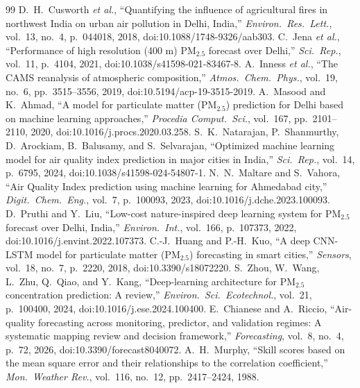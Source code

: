 \documentclass[conference]{IEEEtran}
\begin{document}
\begin{thebibliography}{99}
 D.~H.~Cusworth \emph{et al.}, ``Quantifying the influence of agricultural fires in northwest India on urban air pollution in Delhi, India,'' \emph{Environ.\ Res.\ Lett.}, vol.~13, no.~4, p.~044018, 2018, doi:10.1088/1748-9326/aab303.
 C.~Jena \emph{et al.}, ``Performance of high resolution (400 m) PM$_{2.5}$ forecast over Delhi,'' \emph{Sci.\ Rep.}, vol.~11, p.~4104, 2021, doi:10.1038/s41598-021-83467-8.
 A.~Inness \emph{et al.}, ``The CAMS reanalysis of atmospheric composition,'' \emph{Atmos.\ Chem.\ Phys.}, vol.~19, no.~6, pp.~3515--3556, 2019, doi:10.5194/acp-19-3515-2019.
 A.~Masood and K.~Ahmad, ``A model for particulate matter (PM$_{2.5}$) prediction for Delhi based on machine learning approaches,'' \emph{Procedia Comput.\ Sci.}, vol.~167, pp.~2101--2110, 2020, doi:10.1016/j.procs.2020.03.258.
 S.~K.~Natarajan, P.~Shanmurthy, D.~Arockiam, B.~Balusamy, and S.~Selvarajan, ``Optimized machine learning model for air quality index prediction in major cities in India,'' \emph{Sci.\ Rep.}, vol.~14, p.~6795, 2024, doi:10.1038/s41598-024-54807-1.
 N.~N.~Maltare and S.~Vahora, ``Air Quality Index prediction using machine learning for Ahmedabad city,'' \emph{Digit.\ Chem.\ Eng.}, vol.~7, p.~100093, 2023, doi:10.1016/j.dche.2023.100093.
 D.~Pruthi and Y.~Liu, ``Low-cost nature-inspired deep learning system for PM$_{2.5}$ forecast over Delhi, India,'' \emph{Environ.\ Int.}, vol.~166, p.~107373, 2022, doi:10.1016/j.envint.2022.107373.
 C.-J.~Huang and P.-H.~Kuo, ``A deep CNN-LSTM model for particulate matter (PM$_{2.5}$) forecasting in smart cities,'' \emph{Sensors}, vol.~18, no.~7, p.~2220, 2018, doi:10.3390/s18072220.
 S.~Zhou, W.~Wang, L.~Zhu, Q.~Qiao, and Y.~Kang, ``Deep-learning architecture for PM$_{2.5}$ concentration prediction: A review,'' \emph{Environ.\ Sci.\ Ecotechnol.}, vol.~21, p.~100400, 2024, doi:10.1016/j.ese.2024.100400.
 E.~Chianese and A.~Riccio, ``Air-quality forecasting across monitoring, predictor, and validation regimes: A systematic mapping review and decision framework,'' \emph{Forecasting}, vol.~8, no.~4, p.~72, 2026, doi:10.3390/forecast8040072.
 A.~H.~Murphy, ``Skill scores based on the mean square error and their relationships to the correlation coefficient,'' \emph{Mon.\ Weather Rev.}, vol.~116, no.~12, pp.~2417--2424, 1988.

\end{thebibliography}
\end{document}
